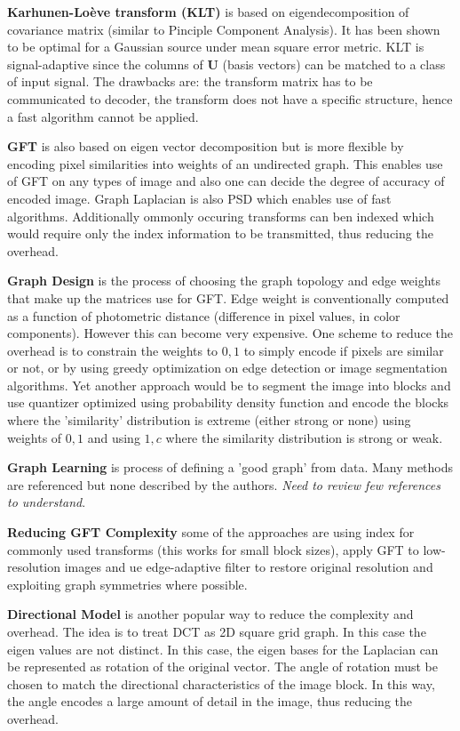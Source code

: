 \documentclass[10pt,a4paper, nocenter]{report}
\begin{document}
	\textbf{Karhunen-Lo\`{e}ve transform (KLT)} is based on eigendecomposition of covariance matrix (similar to Pinciple Component Analysis). It has been shown to be optimal for a Gaussian source under mean square error metric. KLT is signal-adaptive since the columns of \textbf{U} (basis vectors) can be matched to a class of input signal. The drawbacks are: the transform matrix has to be communicated to decoder, the transform does not have a specific structure, hence a fast algorithm cannot be applied.
	
	\textbf{GFT} is also based on eigen vector decomposition but is more flexible by encoding pixel similarities into weights of an undirected graph. This enables use of GFT on any types of image and also one can decide the degree of accuracy of encoded image. Graph Laplacian is also PSD which enables use of fast algorithms.  Additionally ommonly occuring transforms can ben indexed which would require only the index information to be transmitted, thus reducing the overhead. 
	
	\textbf{Graph Design} is the process of choosing the graph topology and edge weights that make up the matrices use for GFT. Edge weight is conventionally computed as a function of photometric distance (difference in pixel values, in color components). However this can become very expensive. One scheme to reduce the overhead is to constrain the weights to ${0,1}$ to simply encode if pixels are similar or not, or by using greedy optimization on edge detection or image segmentation algorithms. Yet another approach would be to segment the image into blocks and use quantizer optimized using probability density function and encode the blocks where the 'similarity' distribution is extreme (either strong or none) using weights of ${0,1}$ and using ${1,c}$ where the similarity distribution is strong or weak.
	
	\textbf{Graph Learning} is process of defining a 'good graph' from data. Many methods are referenced but none described by the authors. \textit{Need to review few references to understand}.
	
	\textbf{Reducing GFT Complexity} some of the approaches are using index for commonly used transforms (this works for small block sizes), apply GFT to low-resolution images and ue edge-adaptive filter to restore original resolution and exploiting graph symmetries where possible.
	
	\textbf{Directional Model} is another popular way to reduce the complexity and overhead. The idea is to treat DCT as 2D square grid graph. In this case the eigen values are not distinct. In this case, the eigen bases for the Laplacian can be represented as rotation of the original vector. The angle of rotation must be chosen to match the directional characteristics of the image block. In this way, the angle encodes a large amount of detail in the image, thus reducing the overhead.
\end{document}

